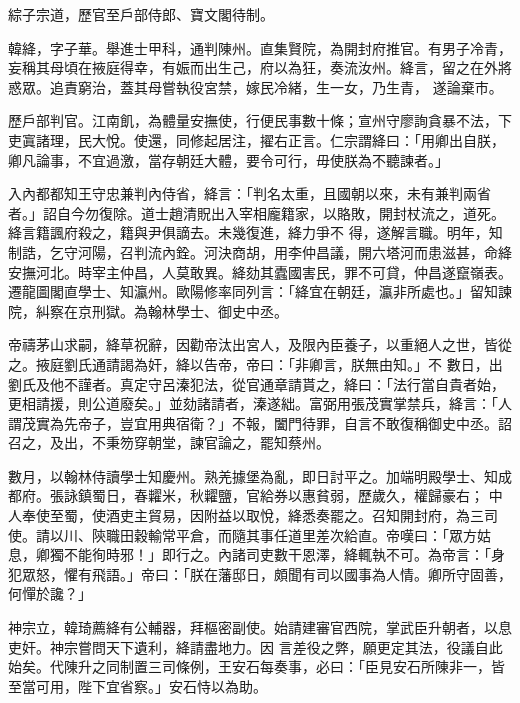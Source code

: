 \begin{pinyinscope}
 綜子宗道，歷官至戶部侍郎、寶文閣待制。



 韓絳，字子華。舉進士甲科，通判陳州。直集賢院，為開封府推官。有男子冷青，妄稱其母頃在掖庭得幸，有娠而出生己，府以為狂，奏流汝州。絳言，留之在外將惑眾。追責窮治，蓋其母嘗執役宮禁，嫁民冷緒，生一女，乃生青，
 遂論棄市。



 歷戶部判官。江南飢，為體量安撫使，行便民事數十條；宣州守廖詢貪暴不法，下吏寘諸理，民大悅。使還，同修起居注，擢右正言。仁宗謂絳曰：「用卿出自朕，卿凡論事，不宜過激，當存朝廷大體，要令可行，毋使朕為不聽諫者。」



 入內都都知王守忠兼判內侍省，絳言：「判名太重，且國朝以來，未有兼判兩省者。」詔自今勿復除。道士趙清貺出入宰相龐籍家，以賂敗，開封杖流之，道死。絳言籍諷府殺之，籍與尹俱謫去。未幾復進，絳力爭不
 得，遂解言職。明年，知制誥，乞守河陽，召判流內銓。河決商胡，用李仲昌議，開六塔河而患滋甚，命絳安撫河北。時宰主仲昌，人莫敢異。絳劾其蠹國害民，罪不可貸，仲昌遂竄嶺表。遷龍圖閣直學士、知瀛州。歐陽修率同列言：「絳宜在朝廷，瀛非所處也。」留知諫院，糾察在京刑獄。為翰林學士、御史中丞。



 帝禱茅山求嗣，絳草祝辭，因勸帝汰出宮人，及限內臣養子，以重絕人之世，皆從之。掖庭劉氏通請謁為奸，絳以告帝，帝曰：「非卿言，朕無由知。」不
 數日，出劉氏及他不謹者。真定守呂溱犯法，從官通章請貰之，絳曰：「法行當自貴者始，更相請援，則公道廢矣。」並劾諸請者，溱遂絀。富弼用張茂實掌禁兵，絳言：「人謂茂實為先帝子，豈宜用典宿衛？」不報，闔門待罪，自言不敢復稱御史中丞。詔召之，及出，不秉笏穿朝堂，諫官論之，罷知蔡州。



 數月，以翰林侍讀學士知慶州。熟羌據堡為亂，即日討平之。加端明殿學士、知成都府。張詠鎮蜀日，春糶米，秋糶鹽，官給券以惠貧弱，歷歲久，權歸豪右；
 中人奉使至蜀，使酒吏主貿易，因附益以取悅，絳悉奏罷之。召知開封府，為三司使。請以川、陝職田穀輸常平倉，而隨其事任道里差次給直。帝嘆曰：「眾方姑息，卿獨不能徇時邪！」即行之。內諸司吏數干恩澤，絳輒執不可。為帝言：「身犯眾怒，懼有飛語。」帝曰：「朕在藩邸日，頗聞有司以國事為人情。卿所守固善，何憚於讒？」



 神宗立，韓琦薦絳有公輔器，拜樞密副使。始請建審官西院，掌武臣升朝者，以息吏奸。神宗嘗問天下遺利，絳請盡地力。因
 言差役之弊，願更定其法，役議自此始矣。代陳升之同制置三司條例，王安石每奏事，必曰：「臣見安石所陳非一，皆至當可用，陛下宜省察。」安石恃以為助。




\end{pinyinscope}
